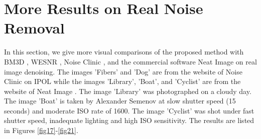 \documentclass[runningheads]{llncs}
\begin{document}
\section{More Results on Real Noise Removal}
In this section, we give more visual comparisons of the proposed method with BM3D \cite{bm3d}, WESNR \cite{wesnr}, Noise Clinic \cite{noiseclinic}, and the commercial software Neat Image \cite{neatimage} on real image denoising.  The images 'Fibers' and 'Dog' are from the website of Noise Clinic on IPOL \cite{ncwebsite} while the images 'Library', 'Boat', and 'Cyclist' are from the website of Neat Image \cite{neatimage}. The image 'Library' was photographed on a cloudy day. The image 'Boat' is taken by Alexander Semenov at slow shutter speed (15 seconds) and moderate ISO rate of 1600. The image 'Cyclist' was shot under fast shutter speed, inadequate lighting and high ISO sensitivity. The results are listed in Figures \ref{fig17}-\ref{fig21}.
\end{document}
